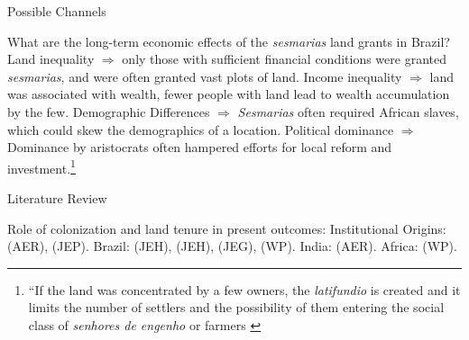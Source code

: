\documentclass[aspectratio=1610]{beamer}
\begin{document}
\begin{frame}{Possible Channels}
    \begin{outline}
        \1 What are the long-term economic effects of the \textit{sesmarias} land grants in Brazil?
        \pause 
            \vspace{1mm}
            \2 Land inequality $\Rightarrow$ only those with sufficient financial conditions were granted \textit{sesmarias}, and were often granted vast plots of land.
            \pause 
            \vspace{1mm}
            \2 Income inequality $\Rightarrow$ land was associated with wealth, fewer people with land lead to wealth accumulation by the few.
            \pause 
            \vspace{1mm}
            \2 Demographic Differences $\Rightarrow$ \textit{Sesmarias} often required African slaves, which could skew the demographics of a location.
            \pause 
            \vspace{1mm}
            \2 Political dominance $\Rightarrow$ Dominance by aristocrats often hampered efforts for local reform and investment.\footnote[frame,1]{``If the land was concentrated by a few owners, the \textit{latifundio} is created and it limits the number of settlers and the possibility of them entering the social class of \textit{senhores de engenho} or farmers \parencite[p.~40]{Bandecchi1963-uj}}
    \end{outline}
\end{frame}

\begin{frame}{Literature Review}
    \begin{outline}
        \1 Role of colonization and land tenure in present outcomes:
            \vspace{2mm}
            \2 Institutional Origins: \cite{Acemoglu2001-dz} (AER), \cite{Sokoloff2000-mb} (JEP). 
            \vspace{2mm}
            \2 Brazil: \cite{Naritomi2012-or} (JEH), 
            \cite{Musacchio2014-pq} (JEH),
            \cite{Wigton-Jones2020-ex} (JEG),
            \cite{Laudares2022-vy} (WP).
            \vspace{2mm}
            \2 India: \cites{Banerjee2005-ki} (AER).
            \vspace{2mm}
            \2 Africa: \cites{Lowes2020-pr} (WP).
    \end{outline}
\end{frame}
\end{document}
